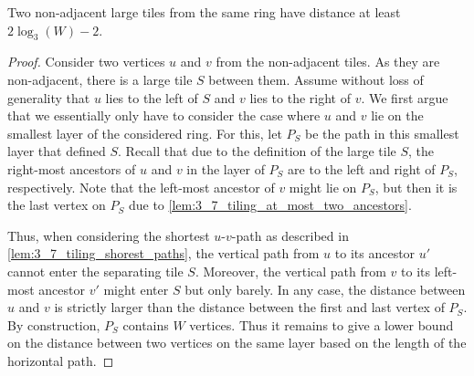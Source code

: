 \documentclass[a4paper,english,cleveref,thm-restate]{lipics-v2021}
\begin{document}
\begin{lemma}
    \label{lem:tiling_large_r_same_ring}
    Two non-adjacent large tiles from the same ring have distance at least $2\log_3(W) - 2$.
\end{lemma}
\begin{proof}
    Consider two vertices $u$ and $v$ from the non-adjacent tiles.
    As they are non-adjacent, there is a large tile $S$ between them.
    Assume without loss of generality that $u$ lies to the left of $S$ and $v$ lies to the right of $v$.
    We first argue that we essentially only have to consider the case where $u$ and $v$ lie on the smallest layer of the considered ring.
    For this, let $P_S$ be the path in this smallest layer that defined $S$.
    Recall that due to the definition of the large tile $S$, the right-most ancestors of $u$ and $v$ in the layer of $P_S$ are to the left and right of $P_S$, respectively.
    Note that the left-most ancestor of $v$ might lie on $P_S$, but then it is the last vertex on $P_S$ due to \cref{lem:3_7_tiling_at_most_two_ancestors}.

    Thus, when considering the shortest $u$-$v$-path as described in \cref{lem:3_7_tiling_shorest_paths}, the vertical path from $u$ to its ancestor $u'$ cannot enter the separating tile $S$.
    Moreover, the vertical path from $v$ to its left-most ancestor $v'$ might enter $S$ but only barely.
    In any case, the distance between $u$ and $v$ is strictly larger than the distance between the first and last vertex of $P_S$.
    By construction, $P_S$ contains $W$ vertices.
    Thus it remains to give a lower bound on the distance between two vertices on the same layer based on the length of the horizontal path.


\end{proof}
\end{document}
